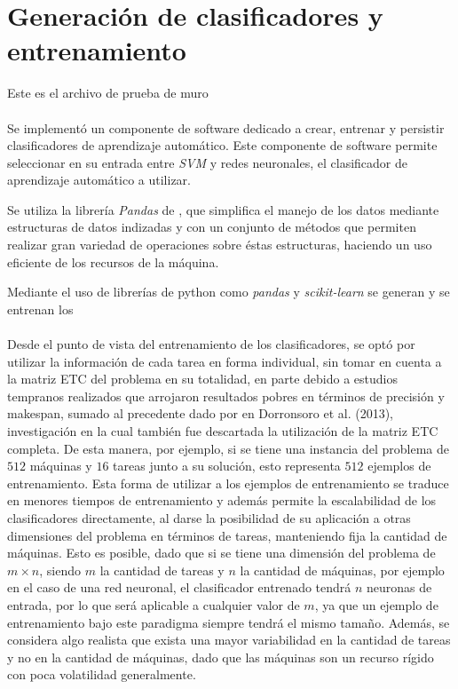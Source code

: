 \section{Generación de clasificadores y entrenamiento}

 Este es el archivo de prueba de muro
\paragraph{} Se implementó un componente de software dedicado a crear, entrenar y persistir clasificadores de aprendizaje automático. Este componente de software permite seleccionar en su entrada entre \textit{SVM} y redes neuronales, el clasificador de aprendizaje automático a utilizar. 

Se utiliza la librería \textit{Pandas} de , que simplifica el manejo de los datos mediante estructuras de datos indizadas y con un conjunto de métodos que permiten realizar gran variedad de operaciones sobre éstas estructuras, haciendo un uso eficiente de los recursos de la máquina.

Mediante el uso de librerías de python como \textit{pandas} y \textit{scikit-learn} se generan y se entrenan los

\paragraph{} Desde el punto de vista del entrenamiento de los clasificadores, se optó por utilizar la información de cada tarea en forma individual, sin tomar en cuenta a la matriz ETC del problema en su totalidad, en parte debido a estudios tempranos realizados que arrojaron resultados pobres en términos de precisión y makespan, sumado al precedente dado por en Dorronsoro et al. (2013), investigación en la cual también fue descartada la utilización de la matriz ETC completa. De esta manera, por ejemplo, si se tiene una instancia del problema de $512$ máquinas y $16$ tareas junto a su solución, esto representa $512$ ejemplos de entrenamiento. Esta forma de utilizar a los ejemplos de entrenamiento se traduce en menores tiempos de entrenamiento y además permite la escalabilidad de los clasificadores directamente, al darse la posibilidad de su aplicación a otras dimensiones del problema en términos de tareas, manteniendo fija la cantidad de máquinas.  Esto es posible, dado que si se tiene una dimensión del problema de $m \times n$, siendo $m$ la cantidad de tareas y $n$ la cantidad de máquinas, por ejemplo en el caso de una red neuronal, el clasificador entrenado tendrá $n$ neuronas de entrada, por lo que será aplicable a cualquier valor de $m$, ya que un ejemplo de entrenamiento bajo este paradigma siempre tendrá el mismo tamaño. Además, se considera algo realista que exista una mayor variabilidad en la cantidad de tareas y no en la cantidad de máquinas, dado que las máquinas son un recurso rígido con poca volatilidad generalmente.


